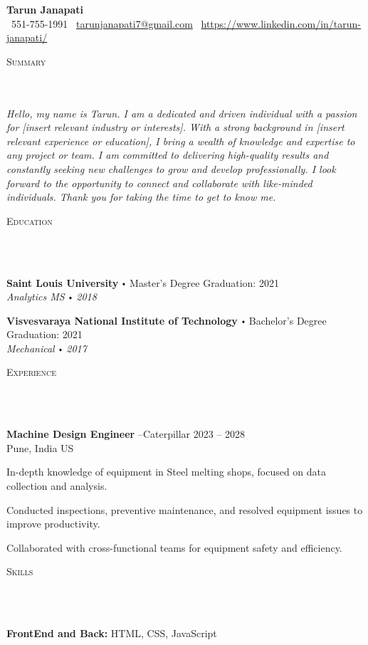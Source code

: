 \documentclass{article}
\newcommand{\school}[4]{
        \textbf{#1} \labelitemi #2 \hfill #3 \\ #4 \vspace*{5pt}
      }
\newcommand{\employer}[4]{{
        \vspace*{2pt}%
        \textbf{#1} #2 \hfill #3\\ #4 \vspace*{2pt}}
        }
\newcommand{\lineunder}{
        \vspace*{-8pt} \\ \hspace*{-18pt} 
        \hrulefill \\
        }
\newcommand{\header}[1]{{
        \hspace*{-15pt}\vspace*{6pt} \textsc{#1}} \vspace*{-6pt} 
        \lineunder
        }
\renewcommand{\labelitemi}{
        $\vcenter{\hbox{\tiny$\bullet$}}$\hspace*{3pt}
        }
\renewcommand{\labelitemii}{
        $\vcenter{\hbox{\tiny$\bullet$}}$\hspace*{-3pt}
        }
\newenvironment{bullet-list-major}{
          \begin{list}{\labelitemii}{\setlength\leftmargin{3pt} 
          \topsep 0pt \itemsep -2pt}}{\vspace*{4pt}\end{list}
          }
\newenvironment{bullet-list-minor}{
          \begin{list}{\labelitemii}{\setlength\leftmargin{15pt} 
            \topsep 0pt \itemsep -2pt}}{\vspace*{4pt}\end{list}
            }
\begin{document}
  
      \small
      \smallskip
      \vspace*{-44pt}
  
      \begin{center}
        {\LARGE \textbf{Tarun Janapati}} \\
        \faPhone\ 551-755-1991 \quad
        \faEnvelope\ \href{mailto:tarunjanapati7@gmail.com}{tarunjanapati7@gmail.com} \quad
        \faLinkedin\ \url{https://www.linkedin.com/in/tarun-janapati/}
      \end{center}
     \vspace*{4pt}%
      \header{Summary}
  
      {
        \textit{Hello, my name is Tarun. I am a dedicated and driven individual with a passion for [insert relevant industry or interests]. With a strong background in [insert relevant experience or education], I bring a wealth of knowledge and expertise to any project or team. I am committed to delivering high-quality results and constantly seeking new challenges to grow and develop professionally. I look forward to the opportunity to connect and collaborate with like-minded individuals. Thank you for taking the time to get to know me.}
        }
  
      \vspace{15pt}
  
     \header{Education}
  
      {
        \school{Saint Louis University}{Master's Degree}{Graduation: 2021}{\textit{Analytics MS \labelitemi 2018}}
        

        \school{Visvesvaraya National Institute of Technology}{Bachelor's Degree}{Graduation: 2021}{\textit{Mechanical \labelitemi 2017}}
        }
  
      \vspace*{4pt}%
      \header{Experience}
  
      {
      \employer{Machine Design Engineer}{--Caterpillar}{2023 -- 2028}{Pune, India US}
      \begin{bullet-list-minor}
          \item In-depth knowledge of equipment in Steel melting shops, focused on data collection and analysis.
\item Conducted inspections, preventive maintenance, and resolved equipment issues to improve productivity.
\item Collaborated with cross-functional teams for equipment safety and efficiency.
      \end{bullet-list-minor}
  }
      \vspace*{4pt}%
      \header{Skills}
      {
        \begin{bullet-list-major}
        \item \textbf{FrontEnd and Back:} HTML, CSS, JavaScript
        \end{bullet-list-major}
        }
  
\end{document}

